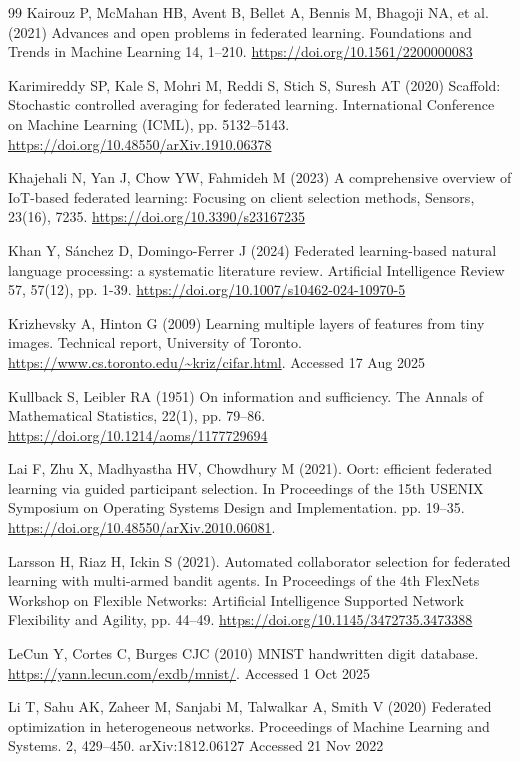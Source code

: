 \documentclass[pdflatex,sn-mathphys-num,oneside]{sn-jnl}%
\theoremstyle{thmstyleone}%
\theoremstyle{thmstyletwo}%
\theoremstyle{thmstylethree}%
\begin{document}
\begin{thebibliography}{99}
Kairouz P, McMahan HB, Avent B, Bellet A, Bennis M, Bhagoji NA, et al. (2021) Advances and open problems in federated learning. Foundations and Trends in Machine Learning 14, 1–210. \url{https://doi.org/10.1561/2200000083}

Karimireddy SP, Kale S, Mohri M, Reddi S, Stich S, Suresh AT (2020) Scaffold: Stochastic controlled averaging for federated learning. International Conference on Machine Learning (ICML), pp. 5132–5143. \url{https://doi.org/10.48550/arXiv.1910.06378}

Khajehali N, Yan J, Chow YW, Fahmideh M (2023) A comprehensive overview of IoT-based federated learning: Focusing on client selection methods, Sensors, 23(16), 7235. \url{https://doi.org/10.3390/s23167235}

Khan Y, Sánchez D, Domingo-Ferrer J (2024) Federated learning-based natural language processing: a systematic literature review. Artificial Intelligence Review 57, 57(12), pp. 1-39. \url{https://doi.org/10.1007/s10462-024-10970-5}

Krizhevsky A, Hinton G (2009) Learning multiple layers of features from tiny images. Technical report, University of Toronto. \url{https://www.cs.toronto.edu/~kriz/cifar.html}. Accessed 17 Aug 2025

Kullback S, Leibler RA (1951) On information and sufficiency. The Annals of Mathematical Statistics, 22(1), pp. 79–86. \url{https://doi.org/10.1214/aoms/1177729694}

Lai F, Zhu X, Madhyastha HV, Chowdhury M (2021). Oort: efficient federated learning via guided participant selection. In Proceedings of the 15th USENIX Symposium on Operating Systems Design and Implementation. pp. 19–35. \url{https://doi.org/10.48550/arXiv.2010.06081}.

Larsson H, Riaz H, Ickin S (2021). Automated collaborator selection for federated learning with multi-armed bandit agents. In Proceedings of the 4th FlexNets Workshop on Flexible Networks: Artificial Intelligence Supported Network Flexibility and Agility, pp. 44–49. \url{https://doi.org/10.1145/3472735.3473388}

LeCun Y, Cortes C, Burges CJC (2010) MNIST handwritten digit database. \url{https://yann.lecun.com/exdb/mnist/}. Accessed 1 Oct 2025

Li T, Sahu AK, Zaheer M, Sanjabi M, Talwalkar A, Smith V (2020) Federated optimization in heterogeneous networks. Proceedings of Machine Learning and Systems. 2, 429–450. arXiv:1812.06127 Accessed 21 Nov 2022


\end{thebibliography}
\end{document}

